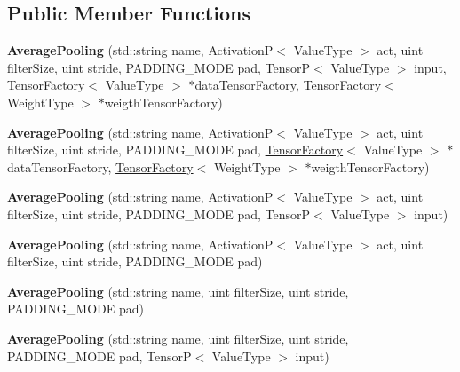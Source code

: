 \subsection*{Public Member Functions}
\begin{DoxyCompactItemize}
\item 
\mbox{\label{classAveragePooling_ad030f12eeea45648ad7044ec2781c1eb}} 
{\bfseries Average\+Pooling} (std\+::string name, ActivationP$<$ Value\+Type $>$ act, uint filter\+Size, uint stride, P\+A\+D\+D\+I\+N\+G\+\_\+\+M\+O\+DE pad, TensorP$<$ Value\+Type $>$ input, \hyperlink{classTensorFactory}{Tensor\+Factory}$<$ Value\+Type $>$ $\ast$data\+Tensor\+Factory, \hyperlink{classTensorFactory}{Tensor\+Factory}$<$ Weight\+Type $>$ $\ast$weigth\+Tensor\+Factory)
\item 
\mbox{\label{classAveragePooling_a21550554dffab144ce43ef6c802567f0}} 
{\bfseries Average\+Pooling} (std\+::string name, ActivationP$<$ Value\+Type $>$ act, uint filter\+Size, uint stride, P\+A\+D\+D\+I\+N\+G\+\_\+\+M\+O\+DE pad, \hyperlink{classTensorFactory}{Tensor\+Factory}$<$ Value\+Type $>$ $\ast$data\+Tensor\+Factory, \hyperlink{classTensorFactory}{Tensor\+Factory}$<$ Weight\+Type $>$ $\ast$weigth\+Tensor\+Factory)
\item 
\mbox{\label{classAveragePooling_a6fda7d16c936b9dc81e0dd011c4b79ad}} 
{\bfseries Average\+Pooling} (std\+::string name, ActivationP$<$ Value\+Type $>$ act, uint filter\+Size, uint stride, P\+A\+D\+D\+I\+N\+G\+\_\+\+M\+O\+DE pad, TensorP$<$ Value\+Type $>$ input)
\item 
\mbox{\label{classAveragePooling_ac54cd5cc290db09b7b5ed6ad310a08aa}} 
{\bfseries Average\+Pooling} (std\+::string name, ActivationP$<$ Value\+Type $>$ act, uint filter\+Size, uint stride, P\+A\+D\+D\+I\+N\+G\+\_\+\+M\+O\+DE pad)
\item 
\mbox{\label{classAveragePooling_acd8ffd6531a30d85dfaf2d5f9afa602c}} 
{\bfseries Average\+Pooling} (std\+::string name, uint filter\+Size, uint stride, P\+A\+D\+D\+I\+N\+G\+\_\+\+M\+O\+DE pad)
\item 
\mbox{\label{classAveragePooling_ab7719a1498669eb0f3ee18149dddb30f}} 
{\bfseries Average\+Pooling} (std\+::string name, uint filter\+Size, uint stride, P\+A\+D\+D\+I\+N\+G\+\_\+\+M\+O\+DE pad, TensorP$<$ Value\+Type $>$ input)

\end{DoxyCompactItemize}
